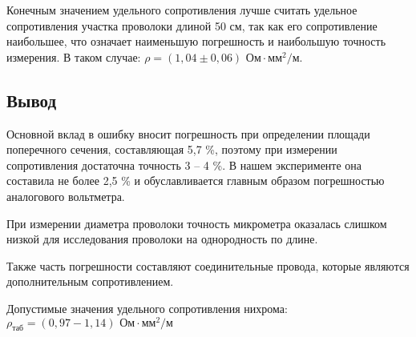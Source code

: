	Конечным значением удельного сопротивления лучше считать удельное сопротивления участка проволоки длиной 50 см, так как его сопротивление наибольшее, что означает наименьшую погрешность и наибольшую точность измерения. В таком случае: $\rho = \left( 1,04 \pm 0,06 \right) \text{ Ом}\cdot \text{мм}^2/\text{м}$.
	
	\subsection{Вывод}
	
	Основной вклад в ошибку вносит погрешность при определении площади поперечного сечения, составляющая 5,7 \%, поэтому при измерении сопротивления достаточна точность 3 -- 4 \%. В нашем эксперименте она составила не более 2,5 \% и обуславливается главным образом погрешностью  аналогового вольтметра.
	
	При измерении диаметра проволоки точность микрометра оказалась слишком низкой для исследования проволоки на однородность по длине.
	
	Также часть погрешности составляют соединительные провода, которые являются дополнительным сопротивлением.
	
	Допустимые значения удельного сопротивления нихрома: $\rho_\text{таб} = (0,97 - 1,14) \text{ Ом}\cdot \text{мм}^2/\text{м}$ 	
	
	
	
	
	
	
	

